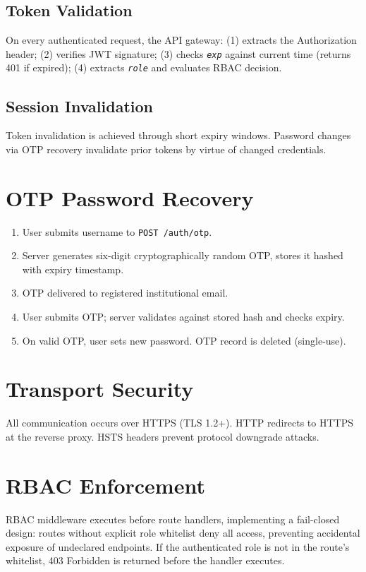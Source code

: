 \documentclass[12pt,a4paper]{report}
\newcommand{\api}[1]{\texttt{\small #1}}
\newcommand{\field}[1]{\texttt{\textit{#1}}}
\begin{document}
\subsection{Token Validation}
On every authenticated request, the API gateway: (1) extracts the Authorization header; (2) verifies JWT signature; (3) checks \field{exp} against current time (returns 401 if expired); (4) extracts \field{role} and evaluates RBAC decision.

\subsection{Session Invalidation}
Token invalidation is achieved through short expiry windows. Password changes via OTP recovery invalidate prior tokens by virtue of changed credentials.

\section{OTP Password Recovery}
\begin{enumerate}[label=(\arabic*)]
  \item User submits username to \api{POST /auth/otp}.
  \item Server generates six-digit cryptographically random OTP, stores it hashed with expiry timestamp.
  \item OTP delivered to registered institutional email.
  \item User submits OTP; server validates against stored hash and checks expiry.
  \item On valid OTP, user sets new password. OTP record is deleted (single-use).
\end{enumerate}

\section{Transport Security}
All communication occurs over HTTPS (TLS 1.2+). HTTP redirects to HTTPS at the reverse proxy. HSTS headers prevent protocol downgrade attacks.

\section{RBAC Enforcement}
RBAC middleware executes before route handlers, implementing a fail-closed design: routes without explicit role whitelist deny all access, preventing accidental exposure of undeclared endpoints. If the authenticated role is not in the route's whitelist, 403 Forbidden is returned before the handler executes.
\end{document}

